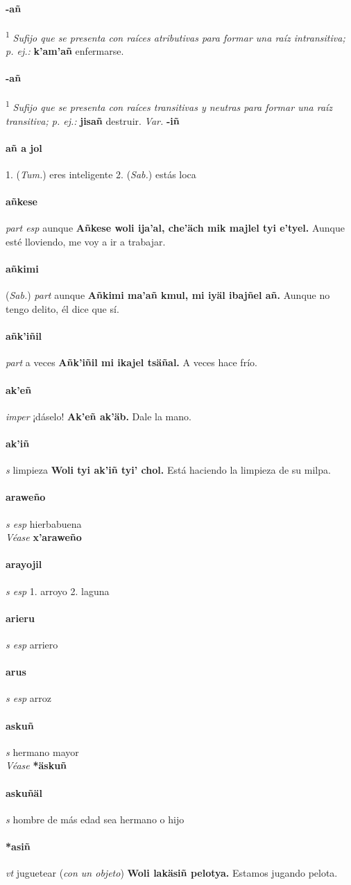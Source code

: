 \documentclass{scrbook}
\newcommand{\entry}[1]{\paragraph{#1}}
\newcommand{\onedefinition}[1]{#1.}
\newcommand{\defsuperscript}[1]{\textsuperscript{1}}
\newcommand{\nontranslationdef}[1]{\textit{#1}}
\newcommand{\partofspeech}[1]{\textit{#1}}
\newcommand{\spanishtranslation}[1]{#1}
\newcommand{\clarification}[1]{(\textit{#1})}
\newcommand{\cholexample}[1]{\textbf{#1}}
\newcommand{\exampletranslation}[1]{#1}
\newcommand{\alsosee}[1]{\\\textit{Véase} \textbf{#1}}
\newcommand{\relevantdialect}[1]{(\textit{#1})}
\newcommand{\variation}[1]{\textit{Var.} \textbf{#1}}
\begin{document}
\begin{multicols}{2}
\entry{-añ}
\defsuperscript{1}
\nontranslationdef{Sufijo que se presenta con raíces atributivas para formar una raíz intransitiva; p. ej.:}
\cholexample{k'am'añ}
\exampletranslation{enfermarse.}

\entry{-añ}
\defsuperscript{2}
\nontranslationdef{Sufijo que se presenta con raíces transitivas y neutras para formar una raíz transitiva; p. ej.:}
\cholexample{jisañ}
\exampletranslation{destruir.}
\variation{-iñ}

\entry{añ a jol}
\onedefinition{1}
\relevantdialect{Tum.}
\spanishtranslation{eres inteligente}
\onedefinition{2}
\relevantdialect{Sab.}
\spanishtranslation{estás loca}

\entry{añkese}
\partofspeech{part esp}
\spanishtranslation{aunque}
\cholexample{Añkese woli ija'al, che'äch mik majlel tyi e'tyel.}
\exampletranslation{Aunque esté lloviendo, me voy a ir a trabajar.}

\entry{añkimi}
\relevantdialect{Sab.}
\partofspeech{part}
\spanishtranslation{aunque}
\cholexample{Añkimi ma'añ kmul, mi iyäl ibajñel añ.}
\exampletranslation{Aunque no tengo delito, él dice que sí.}

\entry{añk'iñil}
\partofspeech{part}
\spanishtranslation{a veces}
\cholexample{Añk'iñil mi ikajel tsäñal.}
\exampletranslation{A veces hace frío.}

\entry{ak'eñ}
\partofspeech{imper}
\spanishtranslation{¡dáselo!}
\cholexample{Ak'eñ ak'äb.}
\exampletranslation{Dale la mano.}

\entry{ak'iñ}
\partofspeech{s}
\spanishtranslation{limpieza}
\cholexample{Woli tyi ak'iñ tyi' chol.}
\exampletranslation{Está haciendo la limpieza de su milpa.}

\entry{araweño}
\partofspeech{s esp}
\spanishtranslation{hierbabuena}
\alsosee{x'araweño}

\entry{arayojil}
\partofspeech{s esp}
\onedefinition{1}
\spanishtranslation{arroyo}
\onedefinition{2}
\spanishtranslation{laguna}

\entry{arieru}
\partofspeech{s esp}
\spanishtranslation{arriero}

\entry{arus}
\partofspeech{s esp}
\spanishtranslation{arroz}

\entry{askuñ}
\partofspeech{s}
\spanishtranslation{hermano mayor}
\alsosee{*äskuñ}

\entry{askuñäl}
\partofspeech{s}
\spanishtranslation{hombre de más edad sea hermano o hijo}

\entry{*asiñ}
\partofspeech{vt}
\spanishtranslation{juguetear}
\clarification{con un objeto}
\cholexample{Woli lakäsiñ pelotya.}
\exampletranslation{Estamos jugando pelota.}


\end{multicols}
\end{document}
